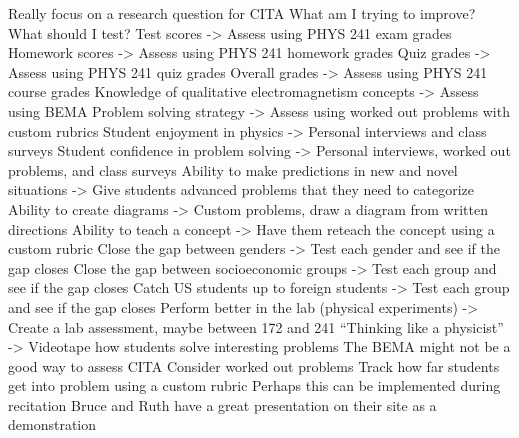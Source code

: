 Really focus on a research question for CITA
What am I trying to improve? What should I test?
Test scores -> Assess using PHYS 241 exam grades
Homework scores -> Assess using PHYS 241 homework grades
Quiz grades -> Assess using PHYS 241 quiz grades
Overall grades -> Assess using PHYS 241 course grades
Knowledge of qualitative electromagnetism concepts -> Assess using BEMA
Problem solving strategy -> Assess using worked out problems with custom rubrics
Student enjoyment in physics -> Personal interviews and class surveys
Student confidence in problem solving -> Personal interviews, worked out problems, and class surveys
Ability to make predictions in new and novel situations -> Give students advanced problems that they need to categorize
Ability to create diagrams -> Custom problems, draw a diagram from written directions
Ability to teach a concept -> Have them reteach the concept using a custom rubric
Close the gap between genders -> Test each gender and see if the gap closes
Close the gap between socioeconomic groups -> Test each group and see if the gap closes
Catch US students up to foreign students -> Test each group and see if the gap closes
Perform better in the lab (physical experiments) -> Create a lab assessment, maybe between 172 and 241
“Thinking like a physicist” -> Videotape how students solve interesting problems
The BEMA might not be a good way to assess CITA
Consider worked out problems
Track how far students get into problem using a custom rubric
Perhaps this can be implemented during recitation
Bruce and Ruth have a great presentation on their site as a demonstration